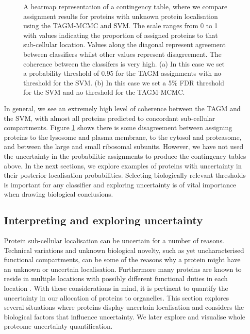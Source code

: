 \documentclass[12pt,english]{article}\usepackage[]{graphicx}\usepackage[]{color}
\newenvironment{knitrout}{}{} %
\begin{document}
\begin{figure}[p]
\begin{subfigure}[t]{0.5\textwidth}
\begin{knitrout}
\end{knitrout}
\end{subfigure}
\caption{A heatmap representation of a contingency table, where we
  compare assignment results for proteins with unknown protein
  localisation using the TAGM-MCMC and SVM. The scale ranges from 0 to
  1 with values indicating the proportion of assigned proteins to that
  sub-cellular location. Values along the diagonal represent agreement
  between classifiers whilst other values represent disagreement. The
  coherence between the classifers is very high.  (a) In this case we
  set a probability threshold of 0.95 for the TAGM assignments with no
  threshold for the SVM.  (b) In this case we set a 5\% FDR threshold
  for the SVM and no threshold for the TAGM-MCMC.}
\label{figure:contigencytables}
\end{figure}

In general, we see an extremely high level of coherence between the
TAGM and the SVM, with almost all proteins predicted to concordant
sub-cellular compartments. Figure \ref{figure:contigencytables} shows
there is some disagreement between assigning proteins to the lysosome
and plasma membrane, to the cytosol and proteasome, and between the
large and small ribosomal subunits.  However, we have not used the
uncertainty in the probabilitic assignments to produce the contingency
tables above. In the next sections, we explore examples of proteins
with uncertainty in their posterior localisation
probabilities. Selecting biologically relevant thresholds is important
for any classifier and exploring uncertainty is of vital importance
when drawing biological conclusions.


\subsection*{Interpreting and exploring uncertainty}

Protein sub-cellular localisation can be uncertain for a number of
reasons. Technical variations and unknown biological novelty, such as
yet uncharacterised functional compartments, can be some of the
reasons why a protein might have an unknown or uncertain
localisation. Furthermore many proteins are known to reside in
multiple locations with possibly different functional duties in each
location \citep{Jeffery:2009}. With these considerations in mind, it is pertinent to
quantify the uncertainty in our allocation of proteins to organelles.
This section explores several situations where proteins display
uncertain localisation and considers the biological factors that
influence uncertainty.  We later explore and visualise whole proteome
uncertainty quantification.
\end{document}
